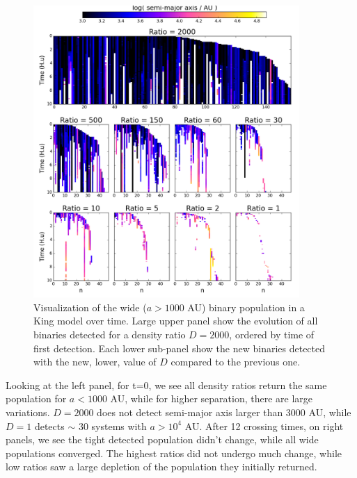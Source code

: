 \begin{figure}
\begin{center}
\includegraphics[width=0.9\textwidth]{Figures/5_flickering}
\caption{Visualization of the wide ($a>1000$ AU) binary population in a King model over time. Large upper panel show the evolution of all binaries detected for a density ratio $D=2000$, ordered by time of first detection. Each lower sub-panel show the new binaries detected with the new, lower, value of $D$ compared to the previous one.}
\label{Fig:5_flickering}
\end{center}
\end{figure}

Looking at the left panel, for t=0, we see all density ratios return the same population for $a < 1000$ AU, while for higher separation, there are large variations. $D = 2000$ does not detect semi-major axis larger than 3000 AU, while $D = 1$ detects $\sim$ 30 systems with $a > 10^4$ AU. After 12 crossing times, on right panels, we see the tight detected population didn't change, while all wide populations converged. The highest ratios did not undergo much change, while low ratios saw a large depletion of the population they initially returned. 

